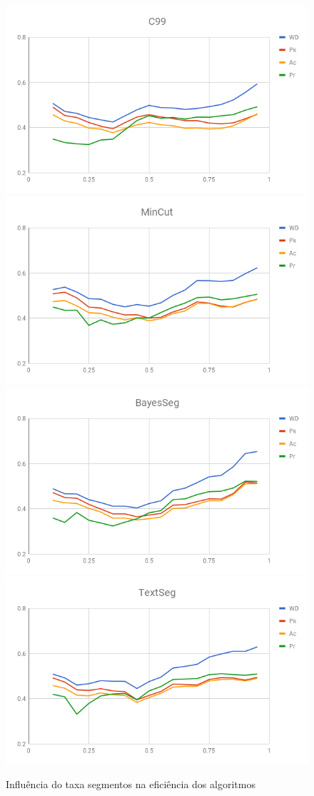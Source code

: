 \begin{figure}[!h] \centering     %

	  \includegraphics[width=.48\textwidth]{conteudo/capitulos/figs/graficos/analiseNSegRate-C99.png}
	  \includegraphics[width=.48\textwidth]{conteudo/capitulos/figs/graficos/analiseNSegRate-MinCut.png}
	  \includegraphics[width=.48\textwidth]{conteudo/capitulos/figs/graficos/analiseNSegRate-Bayes.png}
	  \includegraphics[width=.48\textwidth]{conteudo/capitulos/figs/graficos/analiseNSegRate-UISeg.png}
	\caption{Influência do taxa segmentos na eficiência dos algoritmos}
	\label{fig:influencia-SegRate}
\end{figure}




